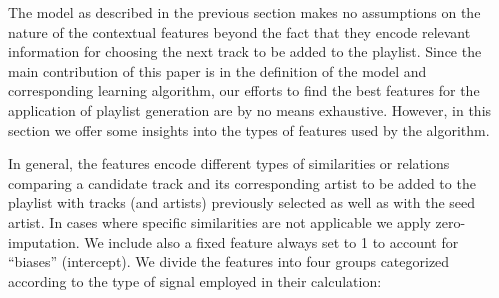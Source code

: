 The model as described in the previous section makes no assumptions on the nature of the contextual features beyond the fact that they encode relevant information for choosing the next track to be added to the playlist.  
Since the main contribution of this paper is in the definition of the model and corresponding learning algorithm, our efforts to find the best features for the application of playlist generation are by no means exhaustive. 
However, in this section we offer some insights into the types of features used by the algorithm.


In general, the features encode different types of similarities or relations  comparing a candidate track and its corresponding artist to be added to the playlist with tracks (and artists) previously selected as well as with the seed artist. In cases where specific similarities are not applicable we apply zero-imputation.
We include also a fixed feature always set to 1 to account for ``biases'' (intercept). 
We divide the features into four groups categorized according to the type of signal employed in their calculation:


